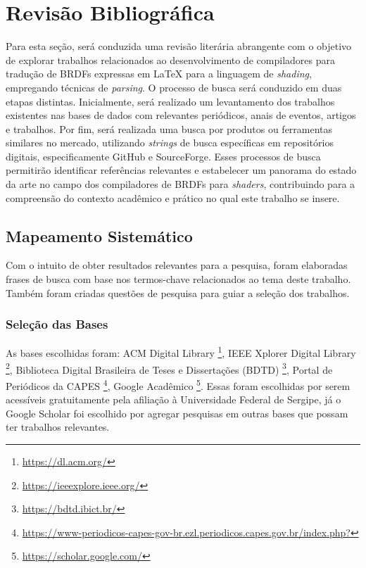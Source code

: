 \documentclass[english,
               brazil,
               bsc] %
               {dcomp-abntex2}
\begin{document}
\chapter{Revisão Bibliográfica} \label{revisao}


Para esta seção, será conduzida uma revisão literária abrangente com o objetivo de explorar trabalhos relacionados ao desenvolvimento de compiladores para tradução de BRDFs expressas em \LaTeX{} para a linguagem de \textit{shading}, empregando técnicas de \textit{parsing}. O processo de busca será conduzido em duas etapas distintas. Inicialmente, será realizado um levantamento dos trabalhos existentes nas bases de dados  com relevantes periódicos, anais de eventos, artigos e trabalhos. Por fim, será realizada uma busca por produtos ou ferramentas similares no mercado, utilizando \textit{strings} de busca específicas em repositórios digitais, especificamente GitHub e SourceForge. Esses processos de busca permitirão identificar referências relevantes e estabelecer um panorama do estado da arte no campo dos compiladores de BRDFs  para \textit{shaders}, contribuindo para a compreensão do contexto acadêmico e prático no qual este trabalho se insere.


\section{Mapeamento Sistemático}


Com o intuito de obter resultados relevantes para a pesquisa, foram elaboradas frases de busca com base nos termos-chave relacionados ao tema deste trabalho. Também foram criadas questões de pesquisa para guiar a seleção dos trabalhos.


\subsection{Seleção das Bases}
As bases escolhidas foram: ACM Digital Library \footnote{\url{https://dl.acm.org/}},  IEEE Xplorer Digital Library \footnote{\url{https://ieeexplore.ieee.org/}},  Biblioteca Digital Brasileira de Teses e Dissertações (BDTD) \footnote{\url{https://bdtd.ibict.br/}}, Portal de Periódicos da CAPES \footnote{\url{https://www-periodicos-capes-gov-br.ezl.periodicos.capes.gov.br/index.php?}},  Google Acadêmico \footnote{\url{https://scholar.google.com/}}. Essas foram escolhidas por serem acessíveis gratuitamente pela afiliação à Universidade Federal de Sergipe, já o Google Scholar foi escolhido por agregar pesquisas em outras bases que possam ter trabalhos relevantes.
\end{document}
